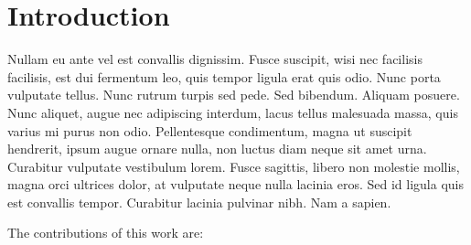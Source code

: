 \documentclass[acmsmall, anonymous]{acmart}
\begin{document}




\maketitle


\section{Introduction}
\label{sec:intro}

Nullam eu ante vel est convallis dignissim. Fusce suscipit, wisi nec facilisis
facilisis, est dui fermentum leo, quis tempor ligula erat quis odio. Nunc porta
vulputate tellus. Nunc rutrum turpis sed pede. Sed bibendum. Aliquam posuere.
Nunc aliquet, augue nec adipiscing interdum, lacus tellus malesuada massa, quis
varius mi purus non odio. Pellentesque condimentum, magna ut suscipit hendrerit,
ipsum augue ornare nulla, non luctus diam neque sit amet urna. Curabitur
vulputate vestibulum lorem. Fusce sagittis, libero non molestie mollis, magna
orci ultrices dolor, at vulputate neque nulla lacinia eros. Sed id ligula quis
est convallis tempor. Curabitur lacinia pulvinar nibh. Nam a sapien.

The contributions of this work are:
\end{document}
